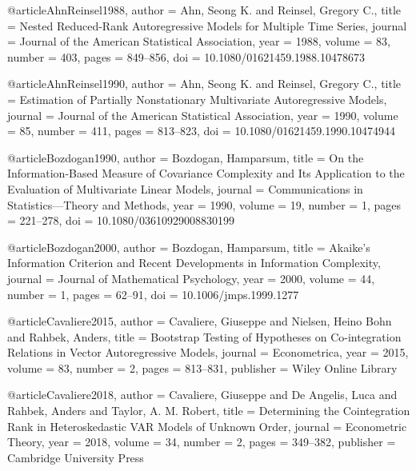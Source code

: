 
@article{AhnReinsel1988,
	author  = {Ahn, Seong K. and Reinsel, Gregory C.},
	title   = {Nested Reduced-Rank Autoregressive Models for Multiple Time Series},
	journal = {Journal of the American Statistical Association},
	year    = {1988},
	volume  = {83},
	number  = {403},
	pages   = {849--856},
	doi     = {10.1080/01621459.1988.10478673}
}

@article{AhnReinsel1990,
	author  = {Ahn, Seong K. and Reinsel, Gregory C.},
	title   = {Estimation of Partially Nonstationary Multivariate Autoregressive Models},
	journal = {Journal of the American Statistical Association},
	year    = {1990},
	volume  = {85},
	number  = {411},
	pages   = {813--823},
	doi     = {10.1080/01621459.1990.10474944}
}

@article{Bozdogan1990,
	author  = {Bozdogan, Hamparsum},
	title   = {On the Information-Based Measure of Covariance Complexity and Its Application to the Evaluation of Multivariate Linear Models},
	journal = {Communications in Statistics---Theory and Methods},
	year    = {1990},
	volume  = {19},
	number  = {1},
	pages   = {221--278},
	doi     = {10.1080/03610929008830199}
}

@article{Bozdogan2000,
	author  = {Bozdogan, Hamparsum},
	title   = {Akaike's Information Criterion and Recent Developments in Information Complexity},
	journal = {Journal of Mathematical Psychology},
	year    = {2000},
	volume  = {44},
	number  = {1},
	pages   = {62--91},
	doi     = {10.1006/jmps.1999.1277}
}

@article{Cavaliere2015,
	author  = {Cavaliere, Giuseppe and Nielsen, Heino Bohn and Rahbek, Anders},
	title   = {Bootstrap Testing of Hypotheses on Co-integration Relations in Vector Autoregressive Models},
	journal = {Econometrica},
	year    = {2015},
	volume  = {83},
	number  = {2},
	pages   = {813--831},
	publisher = {Wiley Online Library}
}

@article{Cavaliere2018,
	author  = {Cavaliere, Giuseppe and De Angelis, Luca and Rahbek, Anders and Taylor, A. M. Robert},
	title   = {Determining the Cointegration Rank in Heteroskedastic VAR Models of Unknown Order},
	journal = {Econometric Theory},
	year    = {2018},
	volume  = {34},
	number  = {2},
	pages   = {349--382},
	publisher = {Cambridge University Press}
}

